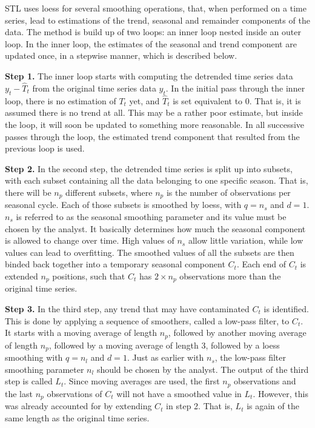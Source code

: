 \documentclass[12pt,oneside]{reedthesis}
\begin{document}
STL uses loess for several smoothing operations, that, when performed on
a time series, lead to estimations of the trend, seasonal and remainder
components of the data. The method is build up of two loops: an inner
loop nested inside an outer loop. In the inner loop, the estimates of
the seasonal and trend component are updated once, in a stepwise manner,
which is described below.

\textbf{Step 1.} The inner loop starts with computing the detrended time
series data \(y_{t} - \hat{T}_{t}\) from the original time series data
\(y_{t}\). In the initial pass through the inner loop, there is no
estimation of \(T_{t}\) yet, and \(\hat{T}_{t}\) is set equivalent to
\(0\). That is, it is assumed there is no trend at all. This may be a
rather poor estimate, but inside the loop, it will soon be updated to
something more reasonable. In all successive passes through the loop,
the estimated trend component that resulted from the previous loop is
used.

\textbf{Step 2.} In the second step, the detrended time series is split
up into subsets, with each subset containing all the data belonging to
one specific season. That is, there will be \(n_{p}\) different subsets,
where \(n_{p}\) is the number of observations per seasonal cycle. Each
of those subsets is smoothed by loess, with \(q = n_{s}\) and \(d = 1\).
\(n_{s}\) is referred to as the seasonal smoothing parameter and its
value must be chosen by the analyst. It basically determines how much
the seasonal component is allowed to change over time. High values of
\(n_{s}\) allow little variation, while low values can lead to
overfitting. The smoothed values of all the subsets are then binded back
together into a temporary seasonal component \(C_{t}\). Each end of
\(C_{t}\) is extended \(n_{p}\) positions, such that \(C_{t}\) has
\(2 \times n_{p}\) observations more than the original time series.

\textbf{Step 3.} In the third step, any trend that may have contaminated
\(C_{t}\) is identified. This is done by applying a sequence of
smoothers, called a low-pass filter, to \(C_{t}\). It starts with a
moving average of length \(n_{p}\), followed by another moving average
of length \(n_{p}\), followed by a moving average of length 3, followed
by a loess smoothing with \(q = n_{l}\) and \(d = 1\). Just as earlier
with \(n_{s}\), the low-pass filter smoothing parameter \(n_{l}\) should
be chosen by the analyst. The output of the third step is called
\(L_{t}\). Since moving averages are used, the first \(n_{p}\)
observations and the last \(n_{p}\) observations of \(C_{t}\) will not
have a smoothed value in \(L_{t}\). However, this was already accounted
for by extending \(C_{t}\) in step 2. That is, \(L_{t}\) is again of the
same length as the original time series.
\end{document}
